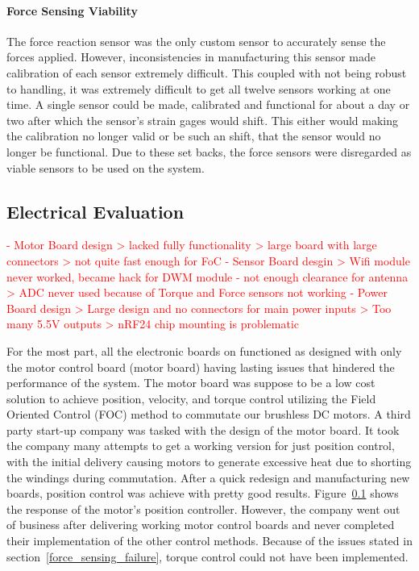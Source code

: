 \paragraph{Force Sensing Viability}
The force reaction sensor was the only custom sensor to accurately sense the forces applied.
However, inconsistencies in manufacturing this sensor made calibration of each sensor extremely difficult.
This coupled with not being robust to handling, it was extremely difficult to get all twelve sensors working at one time.
A single sensor could be made, calibrated and functional for about a day or two after which the sensor's strain gages would shift.
This either would making the calibration no longer valid or be such an shift, that the sensor would no longer be functional.
Due to these set backs, the force sensors were disregarded as viable sensors to be used on the system.

\subsection{Electrical Evaluation}
\textcolor{red}{
 - Motor Board design
   > lacked fully functionality
   > large board with large connectors
   > not quite fast enough for FoC
 - Sensor Board desgin
   > Wifi module never worked, became hack for DWM module - not enough clearance for antenna
   > ADC never used because of Torque and Force sensors not working
 - Power Board design
   > Large design and no connectors for main power inputs
   > Too many 5.5V outputs
   > nRF24 chip mounting is problematic 
}

For the most part, all the electronic boards on \SB{} functioned as designed with only the motor control board (motor board) having lasting issues that hindered the performance of the system.
The motor board was suppose to be a low cost solution to achieve position, velocity, and torque control utilizing the Field Oriented Control (FOC) method to commutate our brushless DC motors.
A third party start-up company was tasked with the design of the motor board.
It took the company many attempts to get a working version for just position control, with the initial delivery causing motors to generate excessive heat due to shorting the windings during commutation.
After a quick redesign and manufacturing new boards, position control was achieve with pretty good results.
Figure~\ref{} shows the response of the motor's position controller.
However, the company went out of business after delivering working motor control boards and never completed their implementation of the other control methods.
Because of the issues stated in section~\ref{force_sensing_failure}, torque control could not have been implemented.

